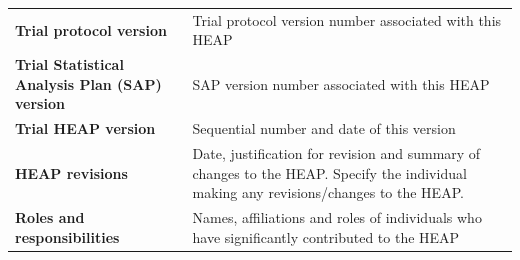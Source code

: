 \begin{table}
\begin{tabular}{ll}
    \\
    \textbf{Trial protocol version} &
                                      Trial protocol version number associated with this HEAP
    \\
    \textbf{Trial Statistical Analysis Plan (SAP) version} &
                                                             SAP version number associated with this HEAP
    \\
    \textbf{Trial HEAP version} &
                                  Sequential number and date of this version
    \\                          
    \textbf{HEAP revisions} &
                              Date, justification for revision and summary of changes to the HEAP. Specify the individual making any revisions/changes to the HEAP.
    \\
    \textbf{Roles and responsibilities} &
                                          Names, affiliations and roles of individuals who have significantly contributed to the HEAP

\end{tabular}
\end{table}
